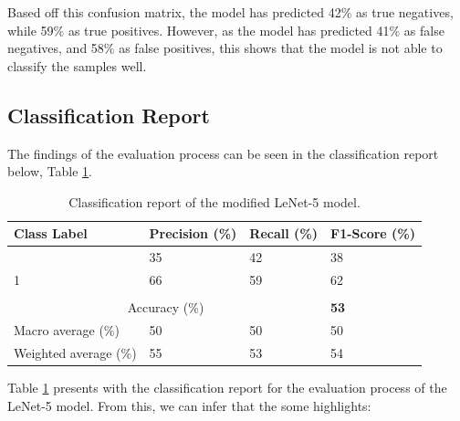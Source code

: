 Based off this confusion matrix, the model has predicted 42\% as true negatives, while 59\% as true positives. However, as the model has predicted 41\% as false negatives, and 58\% as false positives, this shows that the model is not able to classify the samples well.

\subsection{Classification Report}

The findings of the evaluation process can be seen in the classification report below, Table \ref{table:class-report}.

\begin{longtable}{|p{4cm}|p{3cm}|p{3cm}|p{3cm}|}
    \caption{Classification report of the modified LeNet-5 model.}
    \label{table:class-report}\\
    \hline
    \textbf{Class Label} & \textbf{Precision (\%)} & \textbf{Recall (\%)} & \textbf{F1-Score (\%)} \\ [0.5ex] 
    \hline
    \endfirsthead
    \hline
    \endhead
    \hline
    \endfoot
    \endlastfoot
    0 & 35 & 42 & 38 \\ \hline
    1 & 66 & 59 & 62 \\ \hline
    \multicolumn{4}{|c|}{} \\ \hline
    \multicolumn{3}{|c|}{Accuracy (\%)} & \textbf{53} \\ \hline
    Macro average (\%) & 50 & 50 & 50 \\ \hline
    Weighted average (\%) & 55 & 53 & 54 \\ \hline
    
\end{longtable}

Table \ref{table:class-report} presents with the classification report for the evaluation process of the LeNet-5 model. From this, we can infer that the some highlights:\\

